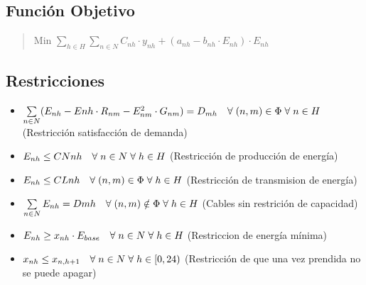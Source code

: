 \documentclass{article}
\begin{document}
\begin{flushleft}
		\subsection{Función Objetivo}
		\begin{quote}
			\begin{center}
				Min $\sum\limits_{h \in H}\sum\limits_{n \in N} C_{nh} \cdot y_{nh} + (a_{nh} - b_{nh} \cdot E_{nh})\cdot E_{nh}$
			\end{center}
		\end{quote}
		\subsection{Restricciones}
		\begin{itemize}
			\item $\sum\limits_{n \in N} (E_{nh} - E{nh} \cdot R_{nm} - E_{nm}^2 \cdot G_{nm}) = D_{mh} \hspace{1em} \forall \hspace{1mm} (n,m) \in \Phi \hspace{1mm} \forall \hspace{1mm} n \in  H$ (Restricción satisfacción de demanda)
			\item $E_{nh} \leq CN{nh} \hspace{1em} \forall \hspace{1mm} n \in N \hspace{1mm} \forall \hspace{1mm} h \in H$ (Restricción de producción de energía)
			\item $E_{nh} \leq CL{nh} \hspace{1em} \forall \hspace{1mm} (n,m) \in \Phi \hspace{1mm} \forall \hspace{1mm} h \in H$ (Restricción de transmision de energía)
			\item $\sum\limits_{n \in N} E_{nh} = D{mh} \hspace{1em} \forall \hspace{1mm} (n,m) \notin \Phi \hspace{1mm} \forall \hspace{1mm} h \in H$ (Cables sin restrición de capacidad)
			\item $E_{nh} \geq x_{nh} \cdot E_{base} \hspace{1em} \forall \hspace{1mm} n \in N \hspace{1mm} \forall \hspace{1mm} h \in H$ (Restriccion de energía mínima)
			\item $x_{nh} \leq x_{n,h+1} \hspace{1em} \forall \hspace{1mm} n \in N \hspace{1mm} \forall \hspace{1mm} h \in [0,24)$ (Restricción de que una vez prendida no se puede apagar)
		\end{itemize}

\end{flushleft}
\end{document}
